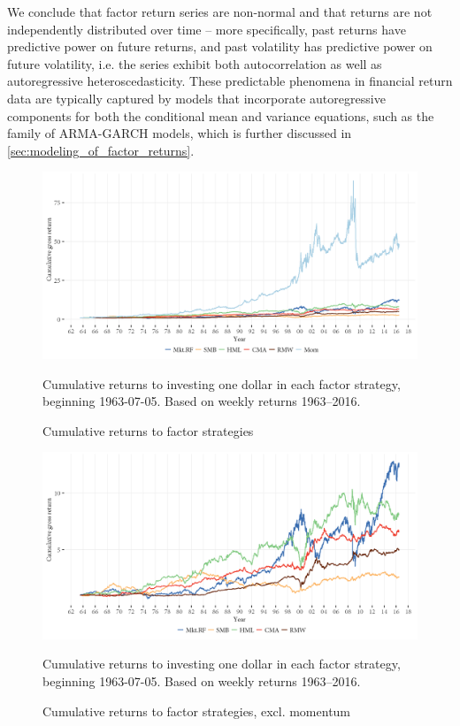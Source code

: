 We conclude that factor return series are non-normal and that returns are not independently distributed over time -- more specifically, past returns have predictive power on future returns, and past volatility has predictive power on future volatility, i.e. the series exhibit both autocorrelation as well as autoregressive heteroscedasticity. These predictable phenomena in financial return data are typically captured by models that incorporate autoregressive components for both the conditional mean and variance equations, such as the family of ARMA-GARCH models, which is further discussed in \autoref{sec:modeling_of_factor_returns}.
\begin{figure}[htbp]
  \centering
  \includegraphics[scale=1]{graphics/cumretPlot.png}  
  \footnotesize
  \caption{Cumulative returns to factor strategies}
  \begin{longcaption}
    Cumulative returns to investing one dollar in each factor strategy, beginning 1963-07-05. Based on weekly returns 1963--2016.
  \end{longcaption}
  \label{fig:cumret}
\end{figure}
\begin{figure}[htbp]
  \centering
  \includegraphics[scale=1]{graphics/cumretPlot_no_mom.png}  
  \footnotesize
  \caption{Cumulative returns to factor strategies, excl. momentum}
  \begin{longcaption}
    Cumulative returns to investing one dollar in each factor strategy, beginning 1963-07-05. Based on weekly returns 1963--2016.
  \end{longcaption}
  \label{fig:cumret_no_mom}
\end{figure}
